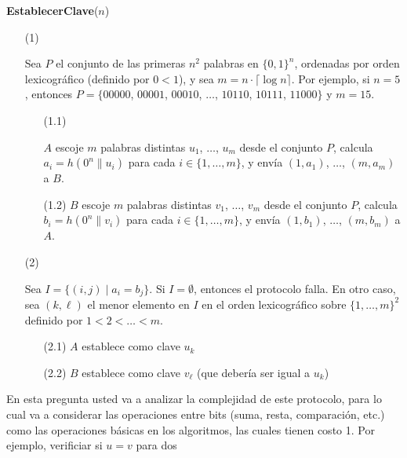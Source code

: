 \begin{flushleft}
{\bf EstablecerClave}($n$)
\begin{enumerate}

\item[(1)] \begin{minipage}[t]{\linewidth}
Sea $P$ el conjunto de las primeras $n^2$ palabras en $\{0,1\}^n$, ordenadas por orden lexicográfico (definido por $0 < 1$), y sea $m = n \cdot \lceil \log n \rceil$. Por ejemplo, si $n = 5$, entonces $P=\{00000$, $00001$, $00010$, $\ldots$, $10110$, $10111$, $11000 \}$ y $m = 15$.
\end{minipage}
\begin{enumerate}
\item[(1.1)] \begin{minipage}[t]{\linewidth} $A$ escoje $m$ palabras distintas $u_1$, $\ldots$, $u_m$ desde el conjunto $P$, calcula $a_i = h(0^n \| u_i)$ para cada $i \in \{1, \ldots, m\}$, y envía $(1,a_1)$, $\ldots$, $(m,a_m)$ a $B$.
\end{minipage}

\item[(1.2)] $B$ escoje $m$ palabras distintas $v_1$, $\ldots$, $v_m$ desde el conjunto $P$, calcula $b_i = h(0^n \| v_i)$ para cada $i \in \{1, \ldots, m\}$, y envía $(1, b_1)$, $\ldots$, $(m, b_m)$ a $A$.
\end{enumerate}
\item[(2)] \begin{minipage}[t]{\linewidth}
Sea $I = \{ (i,j) \mid a_i = b_j\}$. Si $I = \emptyset$, entonces el protocolo falla. En otro caso, sea $(k, \ell)$ el menor elemento en $I$ en el orden lexicográfico sobre $\{1, \ldots, m\}^2$ definido por $1 < 2 < \dots < m$.
\end{minipage}
\begin{enumerate}
\item[(2.1)] $A$ establece como clave $u_{k}$
\item[(2.2)] $B$ establece como clave $v_\ell$ (que debería ser igual a $u_k$)
\end{enumerate}
\end{enumerate}
\end{flushleft}
En esta pregunta usted va a analizar la complejidad de este protocolo,
para lo cual va a considerar las operaciones entre bits (suma, resta,
comparación, etc.) como las operaciones básicas en los algoritmos, las
cuales tienen costo 1. Por ejemplo, verificiar si $u = v$ para dos
